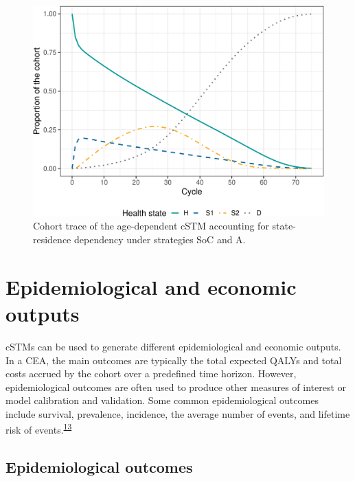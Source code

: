 \documentclass[
]{article}
\begin{document}
\begin{figure}[H]

{\centering \includegraphics{../figs/Sick-Sicker-Trace-HistDep-1} 

}

\caption{Cohort trace of the age-dependent cSTM accounting for state-residence dependency under strategies SoC and A.}\label{fig:Sick-Sicker-Trace-HistDep}
\end{figure}

\hypertarget{epidemiological-and-economic-outputs}{%
\section{Epidemiological and economic outputs}\label{epidemiological-and-economic-outputs}}

cSTMs can be used to generate different epidemiological and economic outputs. In a CEA, the main outcomes are typically the total expected QALYs and total costs accrued by the cohort over a predefined time horizon. However, epidemiological outcomes are often used to produce other measures of interest or model calibration and validation. Some common epidemiological outcomes include survival, prevalence, incidence, the average number of events, and lifetime risk of events.\textsuperscript{\protect\hyperlink{ref-Siebert2012c}{13}}

\hypertarget{epidemiological-outcomes}{%
\subsection{Epidemiological outcomes}\label{epidemiological-outcomes}}
\end{document}
